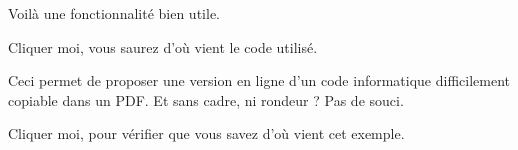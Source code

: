 \documentclass[varwidth, border = 3pt]{standalone}
\begin{document}
Voilà une fonctionnalité bien utile.

%
%
\begin{tcolorbox}[
    enhanced,
    title    = Une boîte pointant vers l'extérieur,
    hyperurl = https://www.latex-project.org/news/2023/03/17/TLC3/,
]
    Cliquer moi, vous saurez d'où vient le code utilisé.
\end{tcolorbox}

Ceci permet de proposer une version en ligne d'un code informatique difficilement copiable dans un PDF. Et sans cadre, ni rondeur ? Pas de souci.

\begin{tcolorbox}[
    enhanced,
    sharp corners,
    notitle,
    hyperurl = https://www.latex-project.org/news/2023/03/17/TLC3/,
    colback  = orange!20,
    boxrule  = 0pt,
    top      = 0pt,
    bottom   = 0pt,
    left     = 0pt,
    right    = 0pt,
]
    Cliquer moi, pour vérifier que vous savez d'où vient cet exemple.
\end{tcolorbox}
\end{document}
